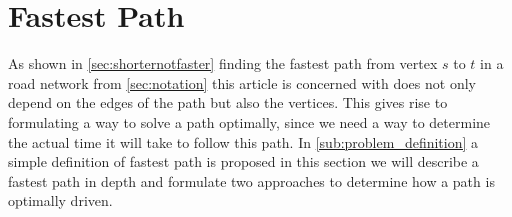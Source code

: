 \section{Fastest Path}
As shown in \cref{sec:shorternotfaster} finding the fastest path from vertex $s$ to $t$ in a road network from \cref{sec:notation} this article is concerned with does not only depend on the edges of the path but also the vertices. This gives rise to formulating a way to solve a path optimally, since we need a way to determine the actual time it will take to follow this path. In \cref{sub:problem_definition} a simple definition of fastest path is proposed in this section we will describe a fastest path in depth and formulate two approaches to determine how a path is optimally driven.  
    

